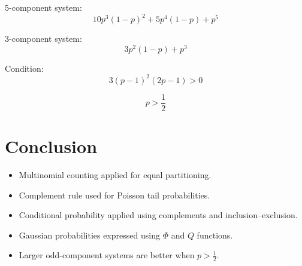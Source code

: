 \documentclass[12pt]{article}
\begin{document}
5-component system:
\[
10p^3(1-p)^2 + 5p^4(1-p) + p^5
\]

3-component system:
\[
3p^2(1-p)+p^3
\]

Condition:
\[
3(p-1)^2(2p-1) > 0
\]

\[
p > \frac{1}{2}
\]

\section*{Conclusion}

\begin{itemize}
\item Multinomial counting applied for equal partitioning.
\item Complement rule used for Poisson tail probabilities.
\item Conditional probability applied using complements and inclusion--exclusion.
\item Gaussian probabilities expressed using $\Phi$ and $Q$ functions.
\item Larger odd-component systems are better when $p > \frac{1}{2}$.
\end{itemize}
\end{document}
